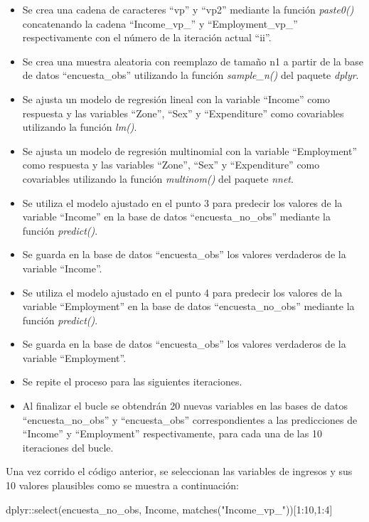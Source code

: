 \documentclass[
  12pt,
]{book}
\newenvironment{Shaded}{\begin{snugshade}}{\end{snugshade}}
\newcommand{\DecValTok}[1]{\textcolor[rgb]{0.00,0.00,0.81}{#1}}
\newcommand{\FunctionTok}[1]{\textcolor[rgb]{0.00,0.00,0.00}{#1}}
\newcommand{\NormalTok}[1]{#1}
\newcommand{\SpecialCharTok}[1]{\textcolor[rgb]{0.00,0.00,0.00}{#1}}
\newcommand{\StringTok}[1]{\textcolor[rgb]{0.31,0.60,0.02}{#1}}
\begin{document}
\begin{itemize}
\item
  Se crea una cadena de caracteres ``vp'' y ``vp2'' mediante la función \emph{paste0()} concatenando la cadena ``Income\_vp\_'' y ``Employment\_vp\_'' respectivamente con el número de la iteración actual ``ii''.
\item
  Se crea una muestra aleatoria con reemplazo de tamaño n1 a partir de la base de datos ``encuesta\_obs'' utilizando la función \emph{sample\_n()} del paquete \emph{dplyr}.
\item
  Se ajusta un modelo de regresión lineal con la variable ``Income'' como respuesta y las variables ``Zone'', ``Sex'' y ``Expenditure'' como covariables utilizando la función \emph{lm()}.
\item
  Se ajusta un modelo de regresión multinomial con la variable ``Employment'' como respuesta y las variables ``Zone'', ``Sex'' y ``Expenditure'' como covariables utilizando la función \emph{multinom()} del paquete \emph{nnet}.
\item
  Se utiliza el modelo ajustado en el punto 3 para predecir los valores de la variable ``Income'' en la base de datos ``encuesta\_no\_obs'' mediante la función \emph{predict()}.
\item
  Se guarda en la base de datos ``encuesta\_obs'' los valores verdaderos de la variable ``Income''.
\item
  Se utiliza el modelo ajustado en el punto 4 para predecir los valores de la variable ``Employment'' en la base de datos ``encuesta\_no\_obs'' mediante la función \emph{predict()}.
\item
  Se guarda en la base de datos ``encuesta\_obs'' los valores verdaderos de la variable ``Employment''.
\item
  Se repite el proceso para las siguientes iteraciones.
\item
  Al finalizar el bucle se obtendrán 20 nuevas variables en las bases de datos ``encuesta\_no\_obs'' y ``encuesta\_obs'' correspondientes a las predicciones de ``Income'' y ``Employment'' respectivamente, para cada una de las 10 iteraciones del bucle.
\end{itemize}

Una vez corrido el código anterior, se seleccionan las variables de ingresos y sus 10 valores plausibles como se muestra a continuación:

\begin{Shaded}
\begin{Highlighting}[]
\NormalTok{dplyr}\SpecialCharTok{::}\FunctionTok{select}\NormalTok{(encuesta\_no\_obs, Income, }\FunctionTok{matches}\NormalTok{(}\StringTok{"Income\_vp\_"}\NormalTok{))[}\DecValTok{1}\SpecialCharTok{:}\DecValTok{10}\NormalTok{,}\DecValTok{1}\SpecialCharTok{:}\DecValTok{4}\NormalTok{]}
\end{Highlighting}
\end{Shaded}
\end{document}
